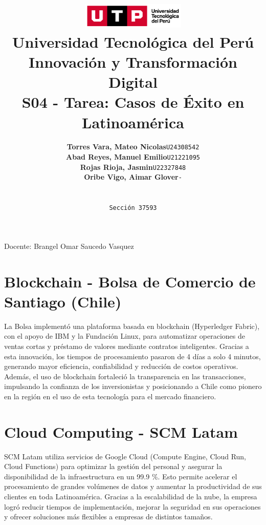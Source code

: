 \documentclass[12pt]{article}
\title{
  \vspace{2cm}
  \pagenumbering{gobble}
  \includegraphics[width=5cm]{./assets/logo-utp.png} \\
  \vspace{1cm}
  \textbf{Universidad Tecnológica del Perú} \\
  \vspace{2cm}
  \textbf{Innovación y Transformación Digital} \\
  \vspace{1cm}
  \large \textbf{S04 - Tarea: Casos de Éxito en Latinoamérica}
}
\author{
  \begin{tabular}{ll}
    \textbf{Torres Vara, Mateo Nicolas} & \texttt{U24308542} \\
    \textbf{Abad Reyes, Manuel Emilio} & \texttt{U21221095} \\
    \textbf{Rojas Rioja, Jasmin} & \texttt{U22327848} \\
    \textbf{Oribe Vigo, Aimar Glover} & \texttt{-} \\
  \end{tabular} \\\\
  \texttt{Sección 37593}
}
\begin{document}
\maketitle
\begin{center}

  Docente: Brangel Omar Saucedo Vasquez

\end{center}

%
%

\newpage
\section*{Blockchain - Bolsa de Comercio de Santiago (Chile)}
\noindent La Bolsa implementó una plataforma basada en blockchain (Hyperledger Fabric), con el apoyo de IBM y la Fundación Linux, para automatizar operaciones de ventas cortas y préstamo de valores mediante contratos inteligentes. Gracias a esta innovación, los tiempos de procesamiento pasaron de 4 días a solo 4 minutos, generando mayor eficiencia, confiabilidad y reducción de costos operativos. Además, el uso de blockchain fortaleció la transparencia en las transacciones, impulsando la confianza de los inversionistas y posicionando a Chile como pionero en la región en el uso de esta tecnología para el mercado financiero.

\section*{Cloud Computing - SCM Latam}
\noindent SCM Latam utiliza servicios de Google Cloud (Compute Engine, Cloud Run, Cloud Functions) para optimizar la gestión del personal y asegurar la disponibilidad de la infraestructura en un 99.9 \%. Esto permite acelerar el procesamiento de grandes volúmenes de datos y aumentar la productividad de sus clientes en toda Latinoamérica. Gracias a la escalabilidad de la nube, la empresa logró reducir tiempos de implementación, mejorar la seguridad en sus operaciones y ofrecer soluciones más flexibles a empresas de distintos tamaños.
\end{document}
